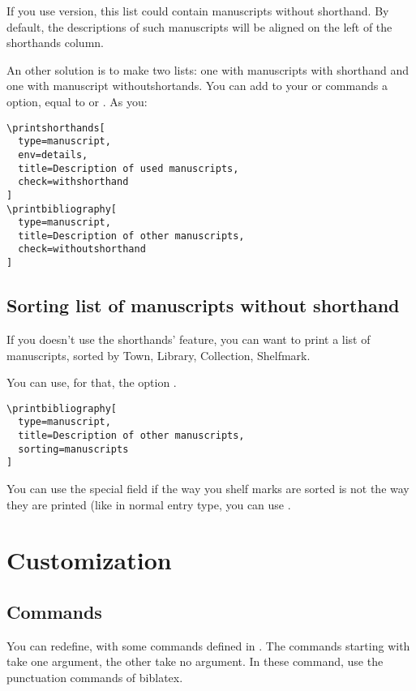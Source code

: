 \documentclass{ltxdockit}[2011/03/25]
\newcommand{\biblatex}{biblatex\xspace}
\begin{document}
If you use  version, this list could contain manuscripts without shorthand. By default, the descriptions of such manuscripts will be aligned on the left of the shorthands column. 

\label{bibcheck}An other solution is to make two lists: one with manuscripts with shorthand and one with manuscript withoutshortands. You can add to your  or   commands a  option, equal to  or . As you:
\begin{verbatim}
\printshorthands[
  type=manuscript,
  env=details,
  title=Description of used manuscripts,
  check=withshorthand
]
\printbibliography[
  type=manuscript,
  title=Description of other manuscripts,
  check=withoutshorthand
]
\end{verbatim}

\subsection{Sorting list of manuscripts without shorthand}

\label{sorting} If you doesn't use the shorthands' feature, you can want to print a list of manuscripts, sorted by Town, Library, Collection, Shelfmark.

You can use, for that, the option . 

\begin{verbatim}
\printbibliography[
  type=manuscript,
  title=Description of other manuscripts,
  sorting=manuscripts
]
\end{verbatim}

You can use the special field  if the way you shelf marks are sorted is not the way they are printed (like in normal entry type, you can use .

\section{Customization}

\subsection{Commands}

You can redefine, with  some commands defined in . The commands starting with  take one argument, the other take no argument. In these command, use the punctuation commands of \biblatex.
\end{document}

